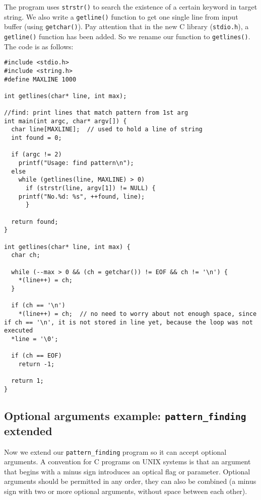 \documentclass[12pt]{article}
\begin{document}
The program uses \texttt{strstr()} to search the existence of a certain keyword in target string. We also write a \texttt{getline()} function to get one single line from input buffer (using \texttt{getchar()}). Pay attention that in the new C library (\texttt{stdio.h}), a \texttt{getline()} function has been added. So we rename our function to \texttt{getlines()}. The code is as follows:
\begin{verbatim}
#include <stdio.h>
#include <string.h>
#define MAXLINE 1000

int getlines(char* line, int max);

//find: print lines that match pattern from 1st arg 
int main(int argc, char* argv[]) {
  char line[MAXLINE];  // used to hold a line of string
  int found = 0;

  if (argc != 2)
    printf("Usage: find pattern\n");
  else
    while (getlines(line, MAXLINE) > 0)
      if (strstr(line, argv[1]) != NULL) {
	printf("No.%d: %s", ++found, line);
      }

  return found;
}

int getlines(char* line, int max) {
  char ch;

  while (--max > 0 && (ch = getchar()) != EOF && ch != '\n') {
    *(line++) = ch;
  }

  if (ch == '\n')
    *(line++) = ch;  // no need to worry about not enough space, since if ch == '\n', it is not stored in line yet, because the loop was not executed
  *line = '\0';

  if (ch == EOF)
    return -1;

  return 1;
}
\end{verbatim}

\subsection{Optional arguments example: \texttt{pattern\_finding} extended}
\label{sec:org8be8e17}
Now we extend our \texttt{pattern\_finding} program so it can accept optional arguments. A convention for C programs on UNIX systems is that an argument that begins with a minus sign introduces an optical flag or parameter. Optional arguments should be permitted in any order, they can also be combined (a minus sign with two or more optional arguments, without space between each other).
\end{document}
